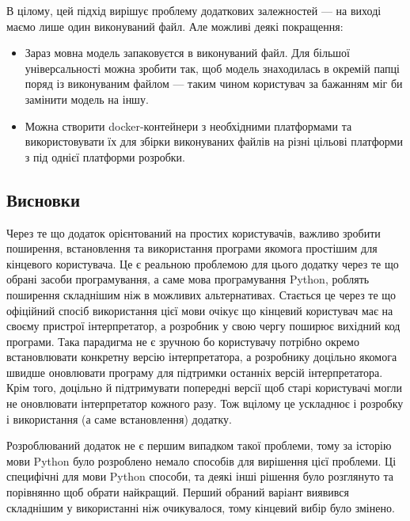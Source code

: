 \documentclass[14pt]{extarticle}
\begin{document}
  В цілому, цей підхід вирішує проблему додаткових залежностей ---
  на виході маємо лише один виконуваний файл. Але можливі деякі покращення:
  \begin{itemize}[labelindent=\dimexpr{}\relax, leftmargin=*]
    \item Зараз мовна модель запаковуєтся в виконуваний файл.
      Для більшої універсальності можна зробити так,
      щоб модель знаходилась в окремій папці поряд із виконуваним файлом ---
      таким чином користувач за бажанням міг би замінити модель на іншу.
    \item Можна створити docker-контейнери з необхідними платформами
    \cite{docker_windows,docker_windows_base, docker_osx}
      та використовувати їх для збірки виконуваних файлів на
      різні цільові платформи з під однієї платформи розробки.
  \end{itemize}

  \subsection{Висновки}

  Через те що додаток орієнтований на простих користувачів,
  важливо зробити поширення,
  встановлення та використання програми якомога простішим
  для кінцевого користувача. Це є реальною проблемою для цього додатку
  через те що обрані засоби програмування, а саме мова програмування Python,
  роблять поширення складнішим ніж в можливих альтернативах.
  Стається це через те що офіційний спосіб використання цієї мови
  очікує що кінцевий користувач має на своєму пристрої інтерпретатор,
  а розробник у свою чергу поширює вихідний код програми.
  Така парадигма не є зручною бо користувачу потрібно
  окремо встановлювати конкретну версію інтерпретатора,
  а розробнику доцільно якомога швидше оновлювати програму
  для підтримки останніх версій інтерпретатора. Крім того,
  доцільно й підтримувати попередні версії щоб старі користувачі
  могли не оновлювати інтерпретатор кожного разу.
  Тож вцілому це ускладнює і розробку і використання (а саме встановлення)
  додатку.

  Розроблюваний додаток не є першим випадком такої проблеми,
  тому за історію мови Python було розроблено немало способів для вирішення
  цієї проблеми. Ці специфічні для мови Python способи,
  та деякі інші рішення було розглянуто та порівнянно щоб обрати найкращий.
  Перший обраний варіант виявився складнішим у використанні ніж очикувалося,
  тому кінцевий вибір було змінено.
\end{document}
